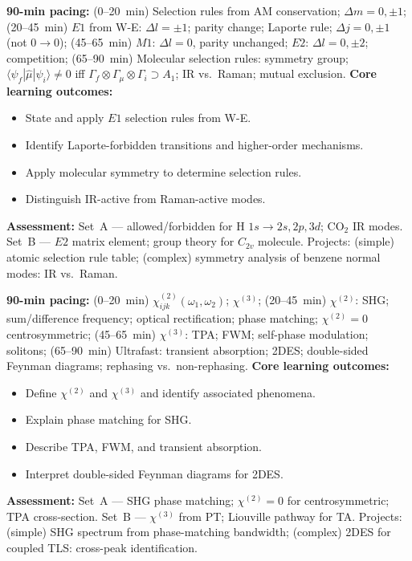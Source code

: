 \documentclass[11pt,a4paper]{article}
\begin{document}
\medskip

\begin{tcolorbox}[modulebox, title={Module~II.6 / L07: Selection Rules}]
\textbf{90-min pacing:} (0--20~min) Selection rules from AM conservation; $\Delta m=0,\pm1$; (20--45~min) $E1$ from W-E: $\Delta l=\pm1$; parity change; Laporte rule; $\Delta j=0,\pm1$ (not $0\to0$); (45--65~min) $M1$: $\Delta l=0$, parity unchanged; $E2$: $\Delta l=0,\pm2$; competition; (65--90~min) Molecular selection rules: symmetry group; $\langle\psi_f|\hat\mu|\psi_i\rangle\neq0$ iff $\Gamma_f\otimes\Gamma_\mu\otimes\Gamma_i\supset A_1$; IR vs.\ Raman; mutual exclusion.
\medskip\textbf{Core learning outcomes:}
\begin{itemize}[leftmargin=1.4em,topsep=2pt,itemsep=1pt]
  \item State and apply $E1$ selection rules from W-E.
  \item Identify Laporte-forbidden transitions and higher-order mechanisms.
  \item Apply molecular symmetry to determine selection rules.
  \item Distinguish IR-active from Raman-active modes.
\end{itemize}
\medskip\textbf{Assessment:}
Set~A --- allowed/forbidden for H $1s\to2s,2p,3d$; CO$_2$ IR modes.
Set~B --- $E2$ matrix element; group theory for $C_{2v}$ molecule.
Projects: (simple) atomic selection rule table; (complex) symmetry analysis of benzene normal modes: IR vs.\ Raman.
\end{tcolorbox}

\medskip

\begin{tcolorbox}[modulebox, title={Module~II.6 / L08: Non-Linear Response}]
\textbf{90-min pacing:} (0--20~min) $\chi^{(2)}_{ijk}(\omega_1,\omega_2)$; $\chi^{(3)}$; (20--45~min) $\chi^{(2)}$: SHG; sum/difference frequency; optical rectification; phase matching; $\chi^{(2)}=0$ centrosymmetric; (45--65~min) $\chi^{(3)}$: TPA; FWM; self-phase modulation; solitons; (65--90~min) Ultrafast: transient absorption; 2DES; double-sided Feynman diagrams; rephasing vs.\ non-rephasing.
\medskip\textbf{Core learning outcomes:}
\begin{itemize}[leftmargin=1.4em,topsep=2pt,itemsep=1pt]
  \item Define $\chi^{(2)}$ and $\chi^{(3)}$ and identify associated phenomena.
  \item Explain phase matching for SHG.
  \item Describe TPA, FWM, and transient absorption.
  \item Interpret double-sided Feynman diagrams for 2DES.
\end{itemize}
\medskip\textbf{Assessment:}
Set~A --- SHG phase matching; $\chi^{(2)}=0$ for centrosymmetric; TPA cross-section.
Set~B --- $\chi^{(3)}$ from PT; Liouville pathway for TA.
Projects: (simple) SHG spectrum from phase-matching bandwidth; (complex) 2DES for coupled TLS: cross-peak identification.
\end{tcolorbox}
\end{document}
